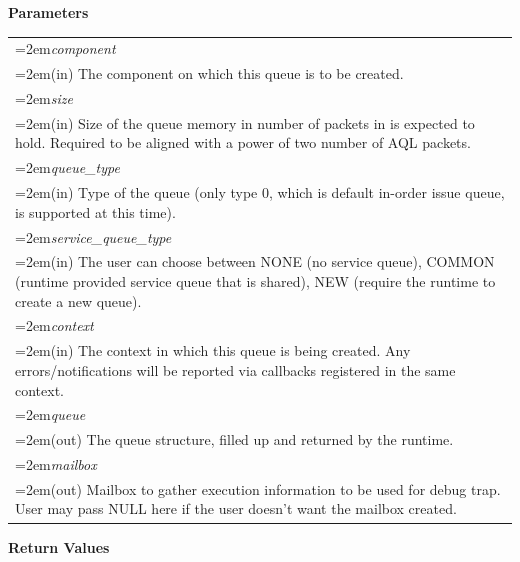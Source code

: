 \documentclass{book}
\newcommand{\hsaarg}[1]{\textit{#1}}
\begin{document}
\noindent\textbf{Parameters}\\[-6mm]
\noindent\begin{longtable}{@{}>{\hangindent=2em}p{\textwidth}}
\hsaarg{component}\\\hspace{2em}(in) The component on which this queue is to be created.\\[2mm]
\hsaarg{size}\\\hspace{2em}(in) Size of the queue memory in number of packets in is expected to hold. Required to be aligned with a power of two number of AQL packets.\\[2mm]
\hsaarg{queue\_type}\\\hspace{2em}(in) Type of the queue (only type 0, which is default in-order issue queue, is supported at this time).\\[2mm]
\hsaarg{service\_queue\_type}\\\hspace{2em}(in) The user can choose between NONE (no service queue), COMMON (runtime provided service queue that is shared), NEW (require the runtime to create a new queue).\\[2mm]
\hsaarg{context}\\\hspace{2em}(in) The context in which this queue is being created. Any errors/notifications will be reported via callbacks registered in the same context.\\[2mm]
\hsaarg{queue}\\\hspace{2em}(out) The queue structure, filled up and returned by the runtime.\\[2mm]
\hsaarg{mailbox}\\\hspace{2em}(out) Mailbox to gather execution information to be used for debug trap. User may pass NULL here if the user doesn't want the mailbox created.
\end{longtable}
\vspace{-5mm}\noindent\textbf{Return Values}\\[-6mm]
\end{document}
